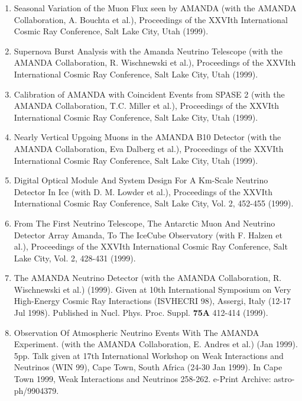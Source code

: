 \begin{enumerate}
\item Seasonal Variation of the Muon Flux seen by AMANDA (with the
  AMANDA Collaboration, A. Bouchta et al.), Proceedings of the XXVIth
  International Cosmic Ray Conference, Salt Lake City, Utah (1999).

\item Supernova Burst Analysis with the Amanda Neutrino Telescope
  (with the AMANDA Collaboration, R. Wischnewski et al.), Proceedings
  of the XXVIth International Cosmic Ray Conference, Salt Lake City,
  Utah (1999).

\item Calibration of AMANDA with Coincident Events from SPASE 2 (with
  the AMANDA Collaboration, T.C. Miller et al.), Proceedings of the
  XXVIth International Cosmic Ray Conference, Salt Lake City, Utah
  (1999).

\item Nearly Vertical Upgoing Muons in the AMANDA B10 Detector (with
  the AMANDA Collaboration, Eva Dalberg et al.), Proceedings of the
  XXVIth International Cosmic Ray Conference, Salt Lake City, Utah
  (1999).

\item Digital Optical Module And System Design For A Km-Scale Neutrino
  Detector In Ice (with D. M. Lowder et al.), Proceedings of the
  XXVIth International Cosmic Ray Conference, Salt Lake City, Vol. 2,
  452-455 (1999).

\item From The First Neutrino Telescope, The Antarctic Muon And
  Neutrino Detector Array Amanda, To The IceCube Observatory (with
  F. Halzen et al.), Proceedings of the XXVIth International Cosmic
  Ray Conference, Salt Lake City, Vol. 2, 428-431 (1999).

\item The AMANDA Neutrino Detector (with the AMANDA Collaboration,
  R. Wischnewski et al.) (1999). Given at 10th International Symposium
  on Very High-Energy Cosmic Ray Interactions (ISVHECRI 98), Assergi,
  Italy (12-17 Jul 1998).  Published in Nucl. Phys. Proc. Suppl. {\bf
    75A} 412-414 (1999).

\item Observation Of Atmospheric Neutrino Events With The AMANDA
  Experiment. (with the AMANDA Collaboration, E. Andres et al.) (Jan
  1999). 5pp.  Talk given at 17th International Workshop on Weak
  Interactions and Neutrinos (WIN 99), Cape Town, South Africa (24-30
  Jan 1999). In Cape Town 1999, Weak Interactions and Neutrinos
  258-262.  e-Print Archive: astro-ph/9904379.


\end{enumerate}
